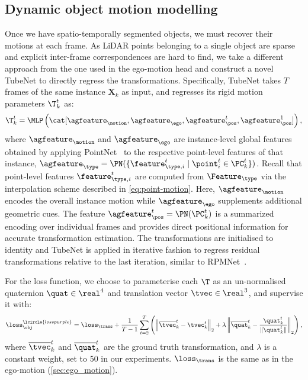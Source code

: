 \subsection{Dynamic object motion modelling}
\label{sec:dynamic_obj}
Once we have spatio-temporally segmented objects, we must
recover their motions at each frame.
As LiDAR points belonging to a single object are sparse and explicit inter-frame correspondences are hard to find, we take a different approach from the one used in the ego-motion head and construct a novel TubeNet to directly regress the transformations.
Specifically, TubeNet takes $T$ frames of the same instance $\mathbf{X}_k$ as input, and regresses its rigid motion parameters $\T^t_k$ as:
\begin{equation}
    \T^t_k = \MLP \left(\cat[ \agfeature_{\motion}, \agfeature_\ego, \agfeature_{\pos}^t, \agfeature_{\pos}^1] \right),
    \label{eq:tubenet}
\end{equation}
where $\agfeature_\motion$ and $\agfeature_\ego$ are instance-level global features obtained by applying PointNet~\cite{qi2017pointnet} to the respective point-level features of that instance, $\agfeature_{\type} = \PN(\{ \feature_{\type,i}^t \; | \; \point_i^t \in \PC_k^t \})$.
Recall that point-level features $\feature_{\type,i}^t$ are computed from $\Feature_{\type}$ via the interpolation scheme described in \cref{eq:point-motion}.
Here, $\agfeature_\motion$ encodes the overall instance motion while $\agfeature_\ego$ supplements additional geometric cues. The feature
$\agfeature_\pos^t = \PN(\PC_k^t)$ is a summarized encoding over individual frames and provides direct positional information for accurate transformation estimation. 
%
The transformations are initialised to identity and TubeNet is applied in iterative fashion to regress residual transformations relative to the last iteration, similar to RPMNet~\cite{yew2020rpm}.

For the loss function, we choose to parameterise each $\T$ as an un-normalised quaternion $\quat \in \real^{4}$ and translation vector $\tvec \in \real^3$, and supervise it with:
\begin{equation}
    \loss_\obj^\lcircle{losspurple} = \loss_\trans + \frac{1}{T-1} \sum_{t=2}^T \left( \left\|\overline{\tvec}_k^t - \tvec_k^t \right\|_2 + \lambda \left\|\overline{\quat}_k^t - \frac{\quat_k^t}{{\|\quat_k^t}\|} \right\|_2 \right),
\end{equation}
where $\overline{\tvec}_k^t$ and $\overline{\quat}_k^t$ are the ground truth transformation, and $\lambda$ is a constant weight, set to 50 in our experiments. 
$\loss_\trans$ is the same as in the ego-motion (\cref{sec:ego_motion}).


